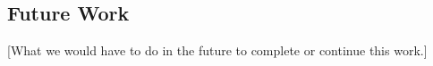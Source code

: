 \subsection{Future Work}\label{Future Work}
    [What we would have to do in the future to complete or continue this work.] 

